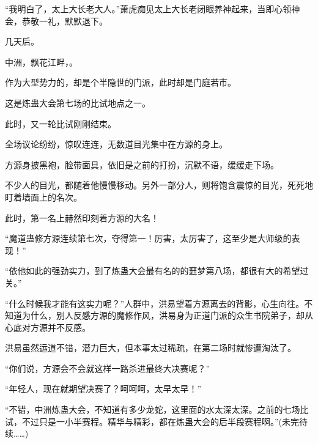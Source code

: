 \begin{this_body}
“我明白了，太上大长老大人。”萧虎痴见太上大长老闭眼养神起来，当即心领神会，恭敬一礼，默默退下。

几天后。

中洲，飘花江畔，。

作为大型势力的，却是个半隐世的门派，此时却是门庭若市。

这是炼蛊大会第七场的比试地点之一。

此时，又一轮比试刚刚结束。

全场议论纷纷，惊叹连连，无数道目光集中在方源的身上。

方源身披黑袍，脸带面具，依旧是之前的打扮，沉默不语，缓缓走下场。

不少人的目光，都随着他慢慢移动。另外一部分人，则将饱含震惊的目光，死死地盯着墙面上的名次。

此时，第一名上赫然印刻着方源的大名！

“魔道蛊修方源连续第七次，夺得第一！厉害，太厉害了，这至少是大师级的表现！”

“依他如此的强劲实力，到了炼蛊大会最有名的的噩梦第八场，都很有大的希望过关。”

“什么时候我才能有这实力呢？”人群中，洪易望着方源离去的背影，心生向往。不知道为什么，别人反感方源的魔修作风，洪易身为正道门派的众生书院弟子，却从心底对方源并不反感。

洪易虽然运道不错，潜力巨大，但本事太过稀疏，在第二场时就惨遭淘汰了。

“你们说，方源会不会就这样一路杀进最终大决赛呢？”

“年轻人，现在就期望决赛了？呵呵呵，太早太早！”

“不错，中洲炼蛊大会，不知道有多少龙蛇，这里面的水太深太深。之前的七场比试，不过只是一小半赛程。精华与精彩，都在炼蛊大会的后半段赛程啊。”(未完待续……)

\end{this_body}

